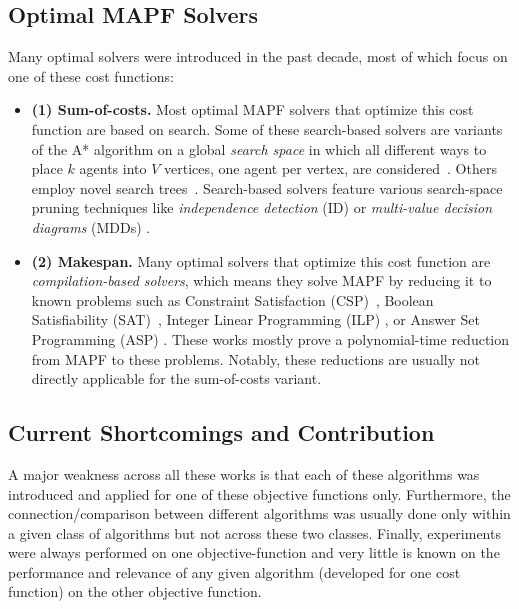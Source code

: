 \documentclass[jair,oneside,11pt]{article}
\begin{document}
\subsection{Optimal MAPF Solvers}

Many optimal solvers were introduced in the past decade, most of which focus on
one of these cost functions:

\begin{itemize}

\item {\bf (1) Sum-of-costs.} Most optimal MAPF solvers that optimize this cost function are based on
search. Some of these search-based solvers are variants of the A* algorithm on
a global {\em search space} in which all different ways to place $k$ agents into $V$
vertices, one agent per vertex, are considered~\cite{DBLP:conf/aaai/Standley10,WagnerC15}.
Others employ novel search trees~\cite{DBLP:conf/ijcai/BoyarskiFSSTBS15,CBSJUR,DBLP:journals/ai/SharonSGF13}.
Search-based solvers feature various search-space pruning techniques like {\em independence detection} (ID) \cite{DBLP:conf/aaai/Standley10} or {\em multi-value decision diagrams} (MDDs) \cite{DBLP:journals/ai/SharonSGF13}.

\item {\bf (2) Makespan.} Many optimal solvers that optimize this cost function are {\em compilation-based solvers}, which means they solve MAPF by reducing it to known problems such as Constraint Satisfaction (CSP)~\cite{DBLP:conf/icra/Ryan10},
Boolean Satisfiability (SAT)~\cite{surynek2012towards}, Integer Linear
Programming (ILP) \cite{yu2013planning}, or Answer Set
Programming (ASP) \cite{erdem2013general}. These works mostly prove a
polynomial-time reduction from MAPF to these problems. 
Notably, these reductions are usually not directly applicable for the sum-of-costs variant. %

\end{itemize}

\subsection{Current Shortcomings and Contribution}

A major weakness across all these works is that each of these algorithms was
introduced and applied for one of these objective functions only. Furthermore,
the connection/comparison between different algorithms was usually done only
within a given class of algorithms but not across these two classes.
Finally, experiments were always performed on one objective-function
and very little is known on the performance and relevance of any given
algorithm (developed for one cost function) on the other objective function.
\end{document}
